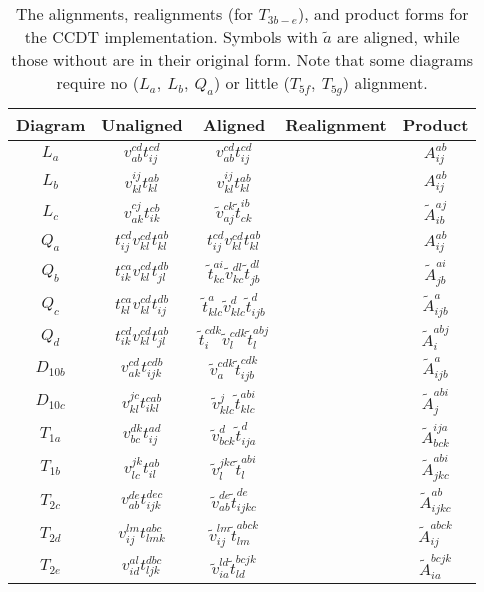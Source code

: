 	\begin{table}[h]
		\centering
		\captionsetup{width=.8\textwidth}
		\caption{The alignments, realignments (for $T_{3b-e}$), and product forms for the CCDT implementation. Symbols with $\tilde{a}$ are aligned, while those without are in their original form. Note that some diagrams require no ($L_a,\:L_b,\:Q_a$) or little ($T_{5f},\:T_{5g}$) alignment.}
		\begin{tabular}{ccccc}
			Diagram & Unaligned & Aligned & Realignment & Product \\ \hline
			$L_a$ & $v_{ab}^{cd}t_{ij}^{cd}$ & $v_{ab}^{cd}t_{ij}^{cd}$ & & $A_{ij}^{ab}$\\
			$L_b$ & $v_{kl}^{ij}t_{kl}^{ab}$ & $v_{kl}^{ij}t_{kl}^{ab}$ & & $A_{ij}^{ab}$\\
			$L_c$ & $v_{ak}^{cj}t_{ik}^{cb}$ & $\tilde{v}_{aj}^{ck}\tilde{t}_{ck}^{ib}$ & & $\tilde{A}_{ib}^{aj}$\\
			$Q_a$ & $t_{ij}^{cd}v_{kl}^{cd}t_{kl}^{ab}$ & $t_{ij}^{cd}v_{kl}^{cd}t_{kl}^{ab}$ & & $A_{ij}^{ab}$\\
			$Q_b$ & $t_{ik}^{ca}v_{kl}^{cd}t_{jl}^{db}$ & $\tilde{t}_{kc}^{ai}\tilde{v}_{kc}^{dl}\tilde{t}_{jb}^{dl}$ & & $\tilde{A}_{jb}^{ai}$\\
			$Q_c$ & $t_{kl}^{ca}v_{kl}^{cd}t_{ij}^{db}$ & $\tilde{t}_{klc}^{a}\tilde{v}_{klc}^{d}\tilde{t}_{ijb}^{d}$ & & $\tilde{A}_{ijb}^a$ \\
			$Q_d$ & $t_{ik}^{cd}v_{kl}^{cd}t_{jl}^{ab}$ & $\tilde{t}_{i}^{cdk}\tilde{v}_{l}^{cdk}\tilde{t}_{l}^{abj}$ & & $\tilde{A}_{i}^{abj}$ \\
			$D_{10b}$ & $v_{ak}^{cd}t_{ijk}^{cdb}$ & $\tilde{v}^{cdk}_{a}\tilde{t}_{ijb}^{cdk}$ & & $\tilde{A}_{ijb}^a$ \\
			$D_{10c}$ & $v_{kl}^{jc}t_{ikl}^{cab}$ & $\tilde{v}_{klc}^{j}\tilde{t}_{klc}^{abi}$ & & $\tilde{A}_{j}^{abi}$ \\
			$T_{1a}$ & $v_{bc}^{dk}t_{ij}^{ad}$ & $\tilde{v}_{bck}^{d}\tilde{t}_{ija}^{d}$ & & $\tilde{A}_{bck}^{ija}$ \\
			$T_{1b}$ & $v_{lc}^{jk}t_{il}^{ab}$ & $\tilde{v}_{l}^{jkc}\tilde{t}_{l}^{abi}$ & & $\tilde{A}_{jkc}^{abi}$ \\
			$T_{2c}$ & $v_{ab}^{de}t_{ijk}^{dec}$ & $\tilde{v}_{ab}^{de}\tilde{t}_{ijkc}^{de}$ & & $\tilde{A}_{ijkc}^{ab}$ \\
			$T_{2d}$ & $v_{ij}^{lm}t_{lmk}^{abc}$ & $\tilde{v}_{ij}^{lm}\tilde{t}_{lm}^{abck}$ & & $\tilde{A}_{ij}^{abck}$ \\
			$T_{2e}$ & $v_{id}^{al}t_{ljk}^{dbc}$ & $\tilde{v}_{ia}^{ld}\tilde{t}_{ld}^{bcjk}$ & & $\tilde{A}_{ia}^{bcjk}$ \\

\end{tabular}
\end{table}
